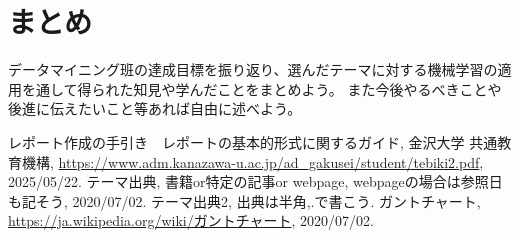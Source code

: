 \documentclass[a4paper, 11pt, titlepage]{jsarticle}
\begin{document}
\section{まとめ}
データマイニング班の達成目標を振り返り、選んだテーマに対する機械学習の適用を通して得られた知見や学んだことをまとめよう。
また今後やるべきことや後進に伝えたいこと等あれば自由に述べよう。

\begin{thebibliography}{n}
  レポート作成の手引き　レポートの基本的形式に関するガイド, 金沢大学 共通教育機構, \url{https://www.adm.kanazawa-u.ac.jp/ad_gakusei/student/tebiki2.pdf}, 2025/05/22.
	テーマ出典, 書籍or特定の記事or webpage, webpageの場合は参照日も記そう, 2020/07/02.
	テーマ出典2, 出典は半角,.で書こう.
	ガントチャート, \url{https://ja.wikipedia.org/wiki/ガントチャート}, 2020/07/02.
\end{thebibliography}
\end{document}
